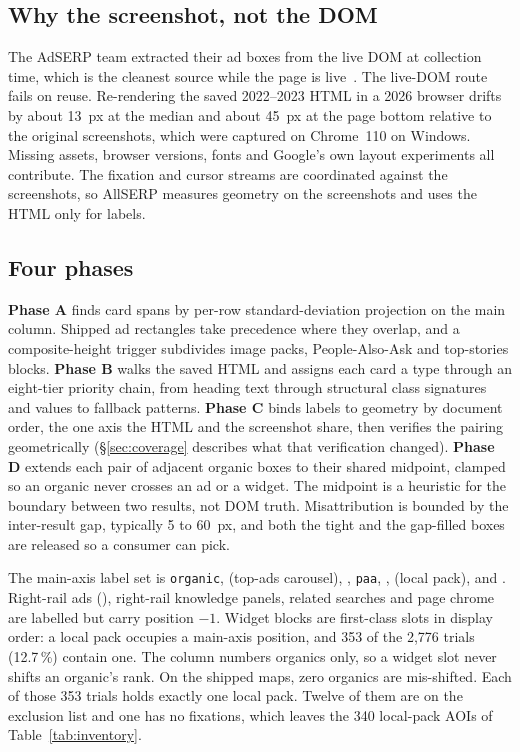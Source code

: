 \documentclass[sigconf,authorversion,natbib=true]{acmart}
\begin{document}
\subsection{Why the screenshot, not the DOM}

The AdSERP team extracted their ad boxes from the live DOM at collection time, which is the cleanest source while the page is live~\cite{latifzadeh2025adserp}. The live-DOM route fails on reuse. Re-rendering the saved 2022--2023 HTML in a 2026 browser drifts by about 13~px at the median and about 45~px at the page bottom relative to the original screenshots, which were captured on Chrome~110 on Windows. Missing assets, browser versions, fonts and Google's own layout experiments all contribute. The fixation and cursor streams are coordinated against the screenshots, so AllSERP measures geometry on the screenshots and uses the HTML only for labels.

\subsection{Four phases}

\textbf{Phase A} finds card spans by per-row standard-deviation projection on the main column. Shipped ad rectangles take precedence where they overlap, and a composite-height trigger subdivides image packs, People-Also-Ask and top-stories blocks. \textbf{Phase B} walks the saved HTML and assigns each card a type through an eight-tier priority chain, from heading text through structural class signatures and  values to fallback patterns. \textbf{Phase C} binds labels to geometry by document order, the one axis the HTML and the screenshot share, then verifies the pairing geometrically (\S\ref{sec:coverage} describes what that verification changed). \textbf{Phase D} extends each pair of adjacent organic boxes to their shared midpoint, clamped so an organic never crosses an ad or a widget. The midpoint is a heuristic for the boundary between two results, not DOM truth. Misattribution is bounded by the inter-result gap, typically 5 to 60~px, and both the tight and the gap-filled boxes are released so a consumer can pick.

The main-axis label set is \texttt{organic},  (top-ads carousel), , \texttt{paa}, ,  (local pack),  and . Right-rail ads (), right-rail knowledge panels, related searches and page chrome are labelled but carry position $-1$. Widget blocks are first-class slots in display order: a local pack occupies a main-axis position, and 353 of the 2,776 trials (12.7\,\%) contain one. The  column numbers organics only, so a widget slot never shifts an organic's rank. On the shipped maps, zero organics are mis-shifted. Each of those 353 trials holds exactly one local pack. Twelve of them are on the exclusion list and one has no fixations, which leaves the 340 local-pack AOIs of Table~\ref{tab:inventory}.
\end{document}
